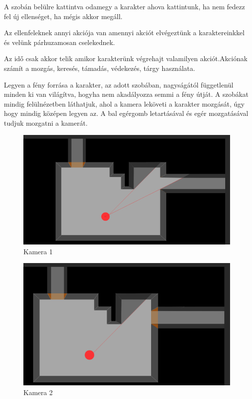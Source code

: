 
A szobán belülre kattintva odamegy a karakter ahova kattintunk, ha nem fedezz fel új ellenséget, ha mégis akkor megáll.

Az ellenfeleknek annyi akciója van amennyi akciót elvégeztünk a karaktereinkkel és velünk párhuzamosan cselekednek.

Az idő csak akkor telik amikor karakterünk végrehajt valamilyen akciót.Akciónak számít a mozgás, keresés, támadás, védekezés, tárgy használata.


Legyen a fény forrása a karakter, az adott szobában, nagyságától függetlenül minden ki van világítva, hogyha nem akadályozza semmi a fény útját.
A szobákat mindig felülnézetben láthatjuk, ahol a kamera leköveti a karakter mozgását, úgy hogy mindig középen legyen az.
A bal egérgomb letartásával és egér mozgatásával tudjuk mozgatni a kamerát.

\begin{figure}[h!]
	\centering
	\includegraphics[scale=1]{images/image6.png}
	\caption{Kamera 1}
	\label{fig:camera1}
\end{figure}

\begin{figure}[h!]
	\centering
	\includegraphics[scale=1]{images/image7.png}
	\caption{Kamera 2}
	\label{fig:camera2}
\end{figure}

